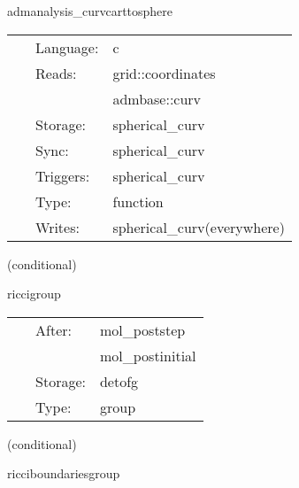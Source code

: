\documentclass{article}
\begin{document}

\hspace{5mm} admanalysis\_curvcarttosphere 

\hspace{5mm}{\it calculate the spherical ex. curvature in r, theta(q), phi(p) } 


\hspace{5mm}

 \begin{tabular*}{160mm}{cll} 
~ & Language:  & c \\ 
~ & Reads:  & grid::coordinates \\ 
~& ~ &admbase::curv\\ 
~ & Storage:  & spherical\_curv \\ 
~ & Sync:  & spherical\_curv \\ 
~ & Triggers:  & spherical\_curv \\ 
~ & Type:  & function \\ 
~ & Writes:  & spherical\_curv(everywhere) \\ 
\end{tabular*} 


\vspace{5mm}

   (conditional) 

\hspace{5mm} riccigroup 

\hspace{5mm}{\it calculate ricci tensor, with boundary conditions } 


\hspace{5mm}

 \begin{tabular*}{160mm}{cll} 
~ & After:  & mol\_poststep \\ 
~& ~ &mol\_postinitial\\ 
~ & Storage:  & detofg \\ 
~ & Type:  & group \\ 
\end{tabular*} 


\vspace{5mm}

   (conditional) 

\hspace{5mm} ricciboundariesgroup 

\hspace{5mm}{\it set ricci tensor on the boundary } 
\end{document}
